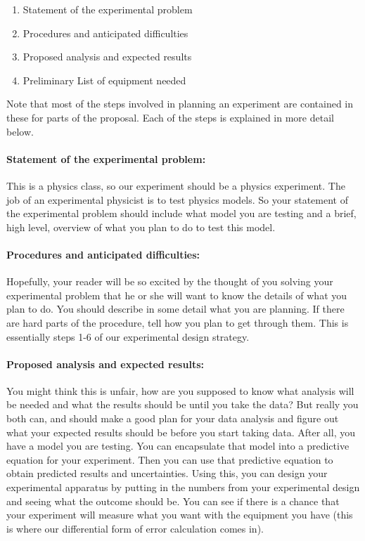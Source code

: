 \documentclass[twoside,11pt,ShortChapTitles]{BYUTextbook}
\begin{document}
\begin{enumerate}
\item Statement of the experimental problem

\item Procedures and anticipated difficulties

\item Proposed analysis and expected results

\item Preliminary List of equipment needed
\end{enumerate}

Note that most of the steps involved in planning an experiment are contained
in these for parts of the proposal. Each of the steps is explained in more
detail below.

\paragraph{\textbf{Statement of the experimental problem:}}

This is a physics class, so our experiment should be a physics experiment.
The job of an experimental physicist is to test physics models. So your
statement of the experimental problem should include what model you are
testing and a brief, high level, overview of what you plan to do to test
this model.

\paragraph{\textbf{Procedures and anticipated difficulties:}}

Hopefully, your reader will be so excited by the thought of you solving your
experimental problem that he or she will want to know the details of what
you plan to do. You should describe in some detail what you are planning. If
there are hard parts of the procedure, tell how you plan to get through
them. This is essentially steps 1-6 of our experimental design strategy.

\paragraph{\textbf{Proposed analysis and expected results:}}

You might think this is unfair, how are you supposed to know what analysis
will be needed and what the results should be until you take the data? But
really you both can, and should make a good plan for your data analysis and
figure out what your expected results should be before you start taking
data. After all, you have a model you are testing. You can encapsulate that
model into a predictive equation for your experiment. Then you can use that
predictive equation to obtain predicted results and uncertainties. Using
this, you can design your experimental apparatus by putting in the numbers
from your experimental design and seeing what the outcome should be. You can
see if there is a chance that your experiment will measure what you want
with the equipment you have (this is where our differential form of error
calculation comes in).
\end{document}
